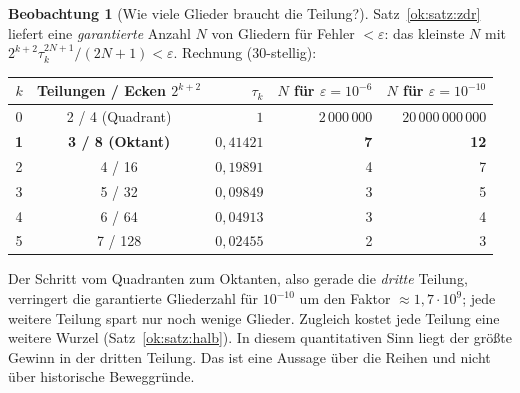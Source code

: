 \documentclass[a4paper,12pt,twoside]{report}
\theoremstyle{definition}
\newtheorem{beobachtung}{Beobachtung}
\begin{document}
\begin{beobachtung}[Wie viele Glieder braucht die Teilung?]\label{ok:beob:termzahl}
Satz~\ref{ok:satz:zdr} liefert eine \emph{garantierte} Anzahl $N$ von Gliedern für Fehler $<\varepsilon$: das kleinste $N$ mit $2^{k+2}\tau_k^{2N+1}/(2N+1)<\varepsilon$. Rechnung (30-stellig):
\begin{center}
\small
\begin{tabular}{c c r r r}
$k$ & Teilungen / Ecken $2^{k+2}$ & $\tau_k$ & $N$ für $\varepsilon=10^{-6}$ & $N$ für $\varepsilon=10^{-10}$\\\hline
0 & 2 / 4 (Quadrant) & $1$ & $2\,000\,000$ & $20\,000\,000\,000$\\
\textbf{1} & \textbf{3 / 8 (Oktant)} & $0{,}41421$ & \textbf{7} & \textbf{12}\\
2 & 4 / 16 & $0{,}19891$ & 4 & 7\\
3 & 5 / 32 & $0{,}09849$ & 3 & 5\\
4 & 6 / 64 & $0{,}04913$ & 3 & 4\\
5 & 7 / 128 & $0{,}02455$ & 2 & 3
\end{tabular}
\end{center}
Der Schritt vom Quadranten zum Oktanten, also gerade die \emph{dritte} Teilung, verringert die garantierte Gliederzahl für $10^{-10}$ um den Faktor $\approx1{,}7\cdot10^{9}$; jede weitere Teilung spart nur noch wenige Glieder. Zugleich kostet jede Teilung eine weitere Wurzel (Satz~\ref{ok:satz:halb}). In diesem quantitativen Sinn liegt der größte Gewinn in der dritten Teilung. Das ist eine Aussage über die Reihen und nicht über historische Beweggründe.
\end{beobachtung}
\end{document}
